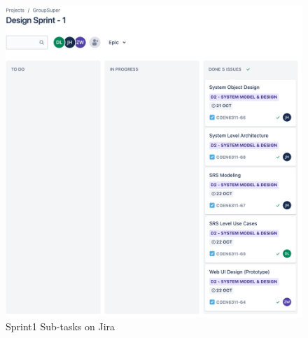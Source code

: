 \documentclass[]{article}
\begin{document}
\begin{figure}[htp]
	\centering
	\includegraphics[scale=0.14]{./img/Sprint1.jpg}
	\caption{Sprint1 Sub-tasks on Jira}
	\label{fig:sprint1}
\end{figure}

% 
% 
\end{document}
